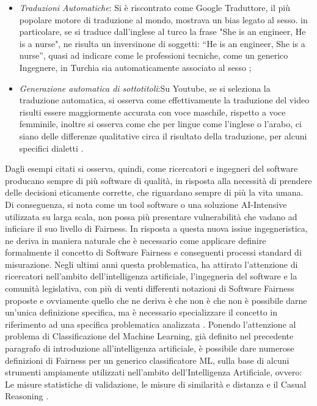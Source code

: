 \begin{itemize}
    \item \emph{Traduzioni Automatiche}: Si è riscontrato come Google Traduttore, il più popolare motore di traduzione al mondo, mostrava un bias legato al sesso. in particolare, se si traduce dall'inglese al turco la frase "She is an engineer, He is a nurse", ne risulta un inversinone di soggetti: “He is an engineer, She is a nurse”, quasi ad indicare come le professioni tecniche, come un generico Ingegnere, in Turchia sia automaticamente associato al sesso  \cite{biasblack2016propublica};
    
    \item \emph{Generazione automatica di sottotitoli}:Su Youtube, se si seleziona la traduzione automatica, si osserva come effettivamente la traduzione del video risulti essere maggiormente accurata con voce maschile, rispetto a voce femminile, inoltre si osserva come che per lingue come l'inglese o l'arabo, ci siano delle differenze qualitative circa il risultato della traduzione, per alcuni specifici dialetti \cite{tatman-2017-gender}.
\end{itemize}

Dagli esempi citati si osserva, quindi, come ricercatori e ingegneri del software producano sempre di più software di qualità, in risposta alla necessità di prendere delle decisioni eticamente corrette, che riguardano sempre di più la vita umana\cite{biasInML}. Di conseguenza, si nota come un tool software o una soluzione AI-Intensive utilizzata su larga scala, non possa più presentare vulnerabilità che vadano ad inficiare il suo livello di Fairness. In risposta a questa nuova issiue ingegneristica, ne deriva in maniera naturale che è necessario come applicare definire formalmente il concetto di Software Fairness e conseguenti processi standard di misurazione.
 Negli ultimi anni questa problematica, ha attirato l'attenzione di ricercatori nell'ambito dell'intelligenza artificiale, l'ingegneria del software e la comunità legislativa, con più di venti differenti notazioni di Software Fairness proposte e ovviamente quello che ne deriva è che non è che non è possibile darne un'unica definizione specifica, ma è necessario specializzare il concetto in riferimento ad una specifica problematica analizzata \cite{FairnessDefinitionExplained}.  Ponendo l'attenzione al problema di Classificazione del Machine Learning, già definito nel precedente paragrafo di introduzione all'intelligenza artificiale, è possibile dare numerose definizioni di Fairness per un generico classificatore ML, sulla base di alcuni strumenti ampiamente utilizzati nell'ambito dell'Intelligenza Artificiale, ovvero: Le misure statistiche di validazione, le misure di similarità e distanza e il Casual Reasoning \cite{FairnessDefinitionExplained}.
 
